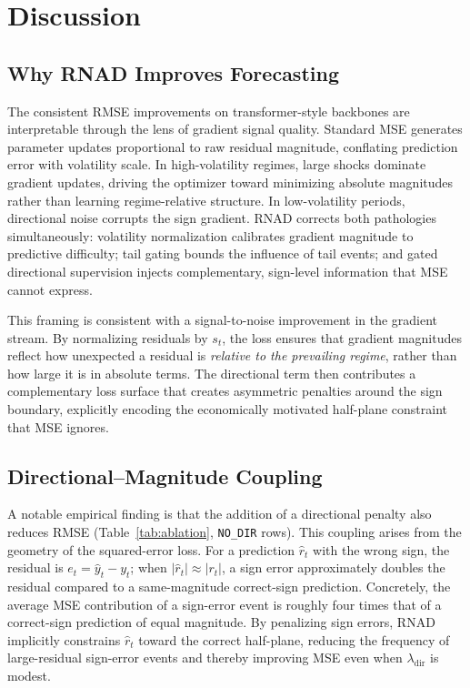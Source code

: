 \documentclass[11pt]{article}
\newcommand{\RNAD}{RNAD\xspace}
\begin{document}
\FloatBarrier
\section{Discussion}
\label{sec:discussion}

\subsection{Why \RNAD Improves Forecasting}

The consistent RMSE improvements on transformer-style backbones are
interpretable through the lens of gradient signal quality. Standard
MSE generates parameter updates proportional to raw residual
magnitude, conflating prediction error with volatility scale. In
high-volatility regimes, large shocks dominate gradient updates,
driving the optimizer toward minimizing absolute magnitudes rather
than learning regime-relative structure. In low-volatility periods,
directional noise corrupts the sign gradient. \RNAD corrects both
pathologies simultaneously: volatility normalization calibrates
gradient magnitude to predictive difficulty; tail gating bounds the
influence of tail events; and gated directional supervision injects
complementary, sign-level information that MSE cannot express.

This framing is consistent with a signal-to-noise improvement in
the gradient stream. By normalizing residuals by $s_t$, the loss
ensures that gradient magnitudes reflect how unexpected a residual
is \emph{relative to the prevailing regime}, rather than how large
it is in absolute terms. The directional term then contributes a
complementary loss surface that creates asymmetric penalties around
the sign boundary, explicitly encoding the economically motivated
half-plane constraint that MSE ignores.

\subsection{Directional--Magnitude Coupling}
\label{ssec:coupling}

A notable empirical finding is that the addition of a directional
penalty also reduces RMSE (Table~\ref{tab:ablation}, \texttt{NO\_DIR}
rows). This coupling arises from the geometry of the squared-error
loss. For a prediction $\hat{r}_t$ with the wrong sign, the residual
is $e_t = \hat{y}_t - y_t$; when $|\hat{r}_t| \approx |r_t|$, a sign
error approximately doubles the residual compared to a same-magnitude
correct-sign prediction. Concretely, the average MSE contribution of
a sign-error event is roughly four times that of a correct-sign
prediction of equal magnitude. By penalizing sign errors, \RNAD
implicitly constrains $\hat{r}_t$ toward the correct half-plane,
reducing the frequency of large-residual sign-error events and thereby
improving MSE even when $\lambda_{\mathrm{dir}}$ is modest.
\end{document}
